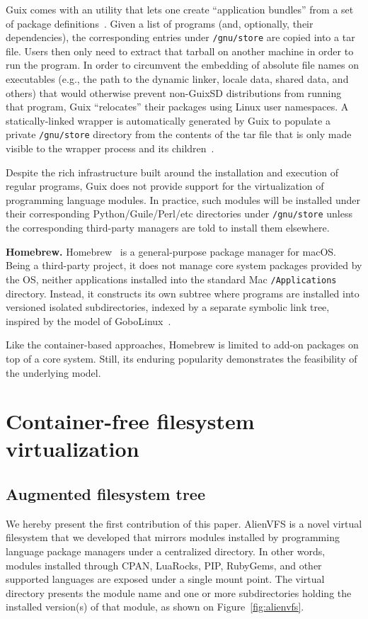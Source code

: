 \documentclass[sigplan, anonymous, 10pt]{acmart}
\begin{document}
Guix comes with an utility that lets one create ``application bundles'' from a set of package
definitions~\cite{gnu2017:bundles}. Given a list of programs (and, optionally, their dependencies),
the corresponding entries under \texttt{/gnu/store} are copied into a tar file. Users then only
need to extract that tarball on another machine in order to run the program. In order to circumvent
the embedding of absolute file names on executables (e.g., the path to the dynamic linker, locale
data, shared data, and others) that would otherwise prevent non-GuixSD distributions from running
that program, Guix ``relocates'' their packages using Linux user namespaces. A statically-linked
wrapper is automatically generated by Guix to populate a private \texttt{/gnu/store} directory
from the contents of the tar file that is only made visible to the wrapper process and its
children~\cite{gnu2018:tarballs}.

Despite the rich infrastructure built around the installation and execution of regular programs,
Guix does not provide support for the virtualization of programming language modules. In practice,
such modules will be installed under their corresponding Python/Guile/Perl/etc directories
under \texttt{/gnu/store} unless the corresponding third-party managers are told to install them
elsewhere.

\textbf{Homebrew.}
Homebrew~\cite{homebrew} is a general-purpose package manager for macOS. Being a third-party project,
it does not manage core system packages provided by the OS, neither applications installed
into the standard Mac \texttt{/Applications} directory. Instead, it constructs its own
subtree where programs are installed into versioned isolated subdirectories, indexed
by a separate symbolic link tree, inspired by the model of
GoboLinux~\cite{howell2009:homebrewgobo}.

Like the container-based approaches, Homebrew is limited to add-on packages on top of
a core system. Still, its enduring popularity demonstrates the feasibility of the
underlying model.

\section{Container-free filesystem virtualization}

\subsection{Augmented filesystem tree}
We hereby present the first contribution of this paper. AlienVFS is a novel virtual
filesystem that we developed that mirrors modules installed by programming language
package managers under a centralized directory. In other words, modules installed
through CPAN, LuaRocks, PIP, RubyGems, and other supported languages are exposed under
a single mount point. The virtual directory presents the module name and one or more
subdirectories holding the installed version(s) of that module, as shown on
Figure~\ref{fig:alienvfs}.
\end{document}

